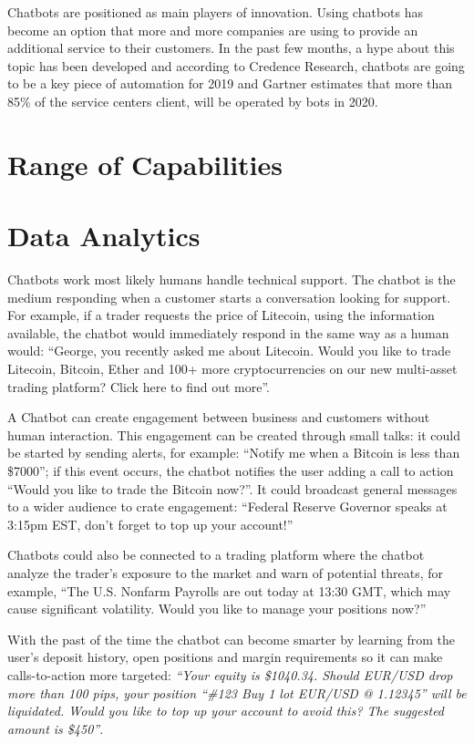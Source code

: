 \documentclass[	DIV=calc,%
							paper=letter,%
							fontsize=12pt%
                            ]{scrartcl}	 					%
\begin{document}
Chatbots are positioned as main players of innovation. Using chatbots has become an option that more and more companies are using to provide an additional service to their customers. In the past few months, a hype about this topic has been developed and according to Credence Research, chatbots are going to be a key piece of automation for 2019 and Gartner estimates that more than 85\% of the service centers client, will be operated by bots in 2020.

\section{\label{sec:level1}Range of Capabilities}

\section{\label{sec:level1}Data Analytics}


Chatbots work most likely humans handle technical support. The chatbot is the medium responding when a customer starts a conversation looking for support. For example, if a trader requests the price of Litecoin, using the information available, the chatbot would immediately respond in the same way as a human would: “George, you recently asked me about Litecoin. Would you like to trade Litecoin, Bitcoin, Ether and 100+ more cryptocurrencies on our new multi-asset trading platform? Click here to find out more”.


A Chatbot can create engagement between business and customers without human interaction. This engagement can be created through small talks: it could be started by sending alerts, for example: “Notify me when a Bitcoin is less than \$7000”; if this event occurs, the chatbot notifies the user adding a call to action “Would you like to trade the Bitcoin now?”. It could broadcast general messages to a wider audience to crate engagement: “Federal Reserve Governor speaks at 3:15pm EST, don’t forget to top up your account!”
 
Chatbots could also be connected to a trading platform where the chatbot analyze the trader’s exposure to the market and warn of potential threats, for example, “The U.S. Nonfarm Payrolls are out today at 13:30 GMT, which may cause significant volatility. Would you like to manage your positions now?”
 
With the past of the time the chatbot can become smarter by learning from the user’s deposit history, open positions and margin requirements so it can make calls-to-action more targeted: \textit{“Your equity is \$1040.34. Should EUR/USD drop more than 100 pips, your position “\#123 Buy 1 lot EUR/USD @ 1.12345” will be liquidated. Would you like to top up your account to avoid this? The suggested amount is \$450”}.
\end{document}
